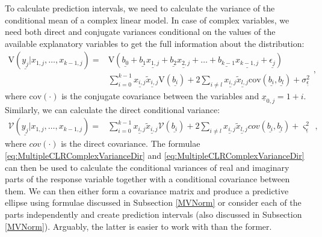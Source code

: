 \documentclass[
]{book}
\begin{document}
To calculate prediction intervals, we need to calculate the variance of the conditional mean of a complex linear model. In case of complex variables, we need both direct and conjugate variances conditional on the values of the available explanatory variables to get the full information about the distribution:
\begin{equation}
    \begin{aligned}
    \mathrm{V}\left(\underline{y_j} | x_{1,j}, \dots, x_{k-1,j} \right) = & \mathrm{V}\left(\underline{b_0} + \underline{b_1} \underline{x_{1,j}} + \underline{b_2} \underline{x_{2,j}} + \dots + \underline{b_{k-1}} \underline{x_{k-1,j}} + \underline{\epsilon_j}\right) \\
    & \sum_{i=0}^{k-1} \underline{x_{i,j}}\underline{\tilde{x}_{i,j}} \mathrm{V}\left(\underline{b_i} \right) + 2 \sum_{i\neq l} \underline{x_{i,j}}\underline{\tilde{x}_{l,j}} \mathrm{cov}\left(\underline{b_i}, \underline{b_l} \right) + \sigma_{\underline{\epsilon}}^2
    \end{aligned},
    \label{eq:MultipleCLRComplexVarianceDir}
\end{equation}
where \(\mathrm{cov}(\cdot)\) is the conjugate covariance between the variables and \(\underline{x}_{0,j}=1+i\). Similarly, we can calculate the direct conditional variance:
\begin{equation}
    \begin{aligned}
    \mathcal{V}\left(\underline{y_j} | x_{1,j}, \dots, x_{k-1,j} \right) = & \sum_{i=0}^{k-1} \underline{x_{i,j}}\underline{\tilde{x}_{i,j}} \mathcal{V}\left(\underline{b_i} \right) + 2 \sum_{i\neq l} \underline{x_{i,j}}\underline{\tilde{x}_{l,j}} {cov}\left(\underline{b_i}, \underline{b_l} \right) + \varsigma_{\underline{\epsilon}}^2
    \end{aligned},
    \label{eq:MultipleCLRComplexVarianceConj}
\end{equation}
where \({cov}(\cdot)\) is the direct covariance. The formulae \eqref{eq:MultipleCLRComplexVarianceDir} and \eqref{eq:MultipleCLRComplexVarianceDir} can then be used to calculate the conditional variances of real and imaginary parts of the response variable together with a conditional covariance between them. We can then either form a covariance matrix and produce a predictive ellipse using formulae discussed in Subsection \ref{MVNorm} or consider each of the parts independently and create prediction intervals (also discussed in Subsection \ref{MVNorm}). Arguably, the latter is easier to work with than the former.
\end{document}
